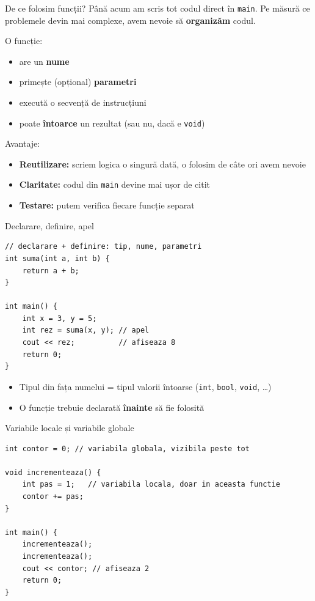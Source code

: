 ﻿\documentclass{beamer}
\begin{document}
\begin{frame}[shrink]{De ce folosim funcții?}
  Până acum am scris tot codul direct în \texttt{main}. Pe măsură ce problemele devin mai complexe, avem nevoie să \textbf{organizăm} codul.

  \begin{block}{O funcție:}
    \begin{itemize}
      \item are un \textbf{nume}
      \item primește (opțional) \textbf{parametri}
      \item execută o secvență de instrucțiuni
      \item poate \textbf{întoarce} un rezultat (sau nu, dacă e \texttt{void})
    \end{itemize}
  \end{block}

  \smallskip
  \begin{block}{Avantaje:}
    \begin{itemize}
      \item \textbf{Reutilizare:} scriem logica o singură dată, o folosim de câte ori avem nevoie
      \item \textbf{Claritate:} codul din \texttt{main} devine mai ușor de citit
      \item \textbf{Testare:} putem verifica fiecare funcție separat
    \end{itemize}
  \end{block}
\end{frame}

\begin{frame}[fragile]{Declarare, definire, apel}
  \begin{lstlisting}
// declarare + definire: tip, nume, parametri
int suma(int a, int b) {
    return a + b;
}

int main() {
    int x = 3, y = 5;
    int rez = suma(x, y); // apel
    cout << rez;          // afiseaza 8
    return 0;
}
  \end{lstlisting}
  \begin{itemize}
    \item Tipul din fața numelui = tipul valorii întoarse (\texttt{int}, \texttt{bool}, \texttt{void}, \dots)
    \item O funcție trebuie declarată \textbf{înainte} să fie folosită
  \end{itemize}
\end{frame}

\begin{frame}[fragile]{Variabile locale și variabile globale}
  \begin{lstlisting}
int contor = 0; // variabila globala, vizibila peste tot

void incrementeaza() {
    int pas = 1;   // variabila locala, doar in aceasta functie
    contor += pas;
}

int main() {
    incrementeaza();
    incrementeaza();
    cout << contor; // afiseaza 2
    return 0;
}
  \end{lstlisting}
\end{frame}
\end{document}
